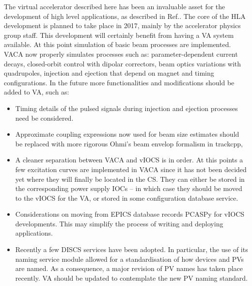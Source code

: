\documentclass[a4paper,
              ]{jacow}
\begin{document}
The virtual accelerator described here has been an invaluable asset for the development of high level applications, as described in Ref.\cite{sirius_hla}.
The core of the HLA development is planned to take place in 2017, mainly by the accelerator physics group staff. This development will certainly benefit from having a VA system available.
At this point simulation of basic beam processes are implemented.
VACA now properly simulates processes such as: parameter-dependent current decays, closed-orbit control with dipolar correctors, beam optics variations with quadrupoles, injection and ejection that depend on magnet and timing configurations.
In the future more functionalities and modifications should be added to VA, such as:
\begin{itemize}
\item Timing details of the pulsed signals during injection and ejection processes need be considered.
\item Approximate coupling expressions now used for beam size estimates should be replaced with more rigorous Ohmi's beam envelop formalism\cite{ohmi} in trackcpp,
\item A cleaner separation between VACA and vIOCS is in order. At this points a few excitation curves are implemented in VACA since it has not been decided yet where they will finally be located in the CS. They can either be stored in the corresponding power supply IOCs -- in which case they should be moved to the vIOCS for the VA, or stored in some configuration database service.
\item Considerations on moving from EPICS  database  records PCASPy for vIOCS developments. This may simplify the process of writing and deploying  applications.
\item Recently a few DISCS\cite{discs} services have been adopted. In particular, the use of its naming service module allowed for a standardisation of how devices and PVs are named. As a consequence, a major revision of PV names has taken place recently. VA should be updated to contemplate the new PV naming standard.
\end{itemize}
\end{document}
